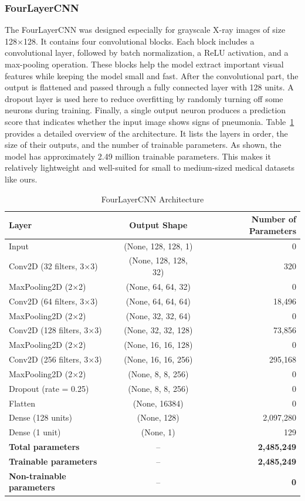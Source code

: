 \documentclass[a4paper,11pt]{article}
\begin{document}
\subsubsection{FourLayerCNN}
The FourLayerCNN was designed especially for grayscale X-ray images of size 128×128. It contains four convolutional blocks. Each block includes a convolutional layer, followed by batch normalization, a ReLU activation, and a max-pooling operation. These blocks help the model extract important visual features while keeping the model small and fast. After the convolutional part, the output is flattened and passed through a fully connected layer with 128 units. A dropout layer is used here to reduce overfitting by randomly turning off some neurons during training. Finally, a single output neuron produces a prediction score that indicates whether the input image shows signs of pneumonia.
Table~\ref{tab:cnn_architecture} provides a detailed overview of the architecture. It lists the layers in order, the size of their outputs, and the number of trainable parameters. As shown, the model has approximately 2.49 million trainable parameters. This makes it relatively lightweight and well-suited for small to medium-sized medical datasets like ours.

\begin{table}[H]
\centering
\caption{FourLayerCNN Architecture}
\label{tab:cnn_architecture}
\begin{tabular}{|l|c|r|}
\hline
\textbf{Layer} & \textbf{Output Shape} & \textbf{Number of Parameters} \\
\hline
Input & (None, 128, 128, 1) & 0 \\
Conv2D (32 filters, 3×3) & (None, 128, 128, 32) & 320 \\
MaxPooling2D (2×2) & (None, 64, 64, 32) & 0 \\
Conv2D (64 filters, 3×3) & (None, 64, 64, 64) & 18,496 \\
MaxPooling2D (2×2) & (None, 32, 32, 64) & 0 \\
Conv2D (128 filters, 3×3) & (None, 32, 32, 128) & 73,856 \\
MaxPooling2D (2×2) & (None, 16, 16, 128) & 0 \\
Conv2D (256 filters, 3×3) & (None, 16, 16, 256) & 295,168 \\
MaxPooling2D (2×2) & (None, 8, 8, 256) & 0 \\
Dropout (rate = 0.25) & (None, 8, 8, 256) & 0 \\
Flatten & (None, 16384) & 0 \\
Dense (128 units) & (None, 128) & 2,097,280 \\
Dense (1 unit) & (None, 1) & 129 \\
\hline
\textbf{Total parameters} & – & \textbf{2,485,249} \\
\textbf{Trainable parameters} & – & \textbf{2,485,249} \\
\textbf{Non-trainable parameters} & – & \textbf{0} \\
\hline
\end{tabular}
\end{table}
\end{document}

